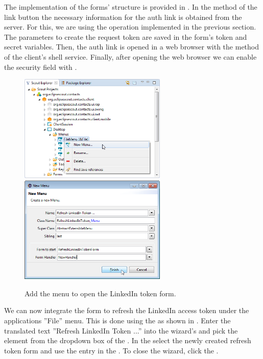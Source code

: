 \documentclass[a4paper,10pt,twoside]{book}
\begin{document}
The implementation of the forms' structure is provided in .
In the  method of the  link button the necessary information for the auth link is obtained from the server. 
For this, we are using the  operation implemented in the previous section. 
The parameters to create the request token are saved in the form's token and secret variables. 
Then, the auth link is opened in a web browser with the   method of the client's shell service. 
Finally, after opening the web browser we can enable the security field with .

\begin{figure}
\includegraphics[width=7cm]{new_menu_refreshtoken_contextmenu.png} \hspace{5mm}
\includegraphics[width=7cm]{new_menu_refreshtoken.png}
\caption{Add the menu to open the LinkedIn token form.}
\end{figure}

We can now integrate the form to refresh the LinkedIn access token under the applications ''File'' menu. 
This is done using the  as shown in . 
Enter the translated text ''Refresh LinkedIn Token ...'' into the wizard's  and pick the element  from the dropdown box of the . 
In the  select the newly created refresh token form and use the  entry in the . 
To close the wizard, click the .
\end{document}

